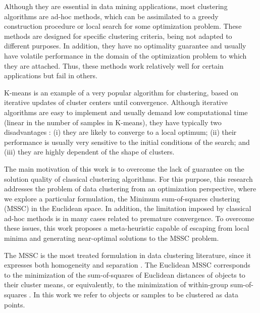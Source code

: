 Although they are essential in data mining applications, most clustering algorithms are ad-hoc methods, which can be assimilated to a greedy construction procedure or local search for some optimization problem. These methods are designed for specific clustering criteria, being not adapted to different purposes. In addition, they have no optimality guarantee and usually have volatile performance in the domain of the optimization problem to which they are attached. Thus, these methods work relatively well for certain applications but fail in others.

K-means is an example of a very popular algorithm for clustering, based on iterative updates of cluster centers until convergence. Although iterative algorithms are easy to implement and usually demand low computational time (linear in the number of samples in K-means), they have typically two disadvantages \cite{Das2009}: (i) they are likely to converge to a local optimum; (ii) their performance is usually very sensitive to the initial conditions of the search; and (iii) they are highly dependent of the shape of clusters.

The main motivation of this work is to overcome the lack of guarantee on the solution quality of classical clustering algorithms. For this purpose, this research addresses the problem of data clustering from an optimization perspective, where we explore a particular formulation, the Minimum sum-of-squares clustering (MSSC) in the Euclidean space. In addition, the limitation imposed by classical ad-hoc methods is in many cases related to premature convergence. To overcome these issues, this work proposes a meta-heuristic capable of escaping from local minima and generating near-optimal solutions to the MSSC problem.

The MSSC is the most treated formulation in data clustering literature, since it expresses both homogeneity and separation \cite{Hansen2009}. The Euclidean MSSC corresponds to the minimization of the sum-of-squares of Euclidean distances of objects to their cluster means, or equivalently, to the minimization of within-group sum-of-squares \cite{Xavier2011}. In this work we refer to objects or samples to be clustered as data points.


